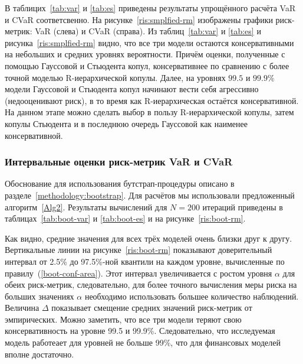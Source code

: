 
В таблицих~\ref{tab:var} и \ref{tab:es} приведены результаты упрощённого расчёта VaR и CVaR соответсвенно.
На рисунке~\ref{ris:smplfied-rm} изображены графики риск-метрик: VaR (слева) и CVaR (справа). 
Из таблиц~\ref{tab:var} и \ref{tab:es} и рисунка~\ref{ris:smplfied-rm} видно, что все три модели остаются консервативными на небольших и средних уровнях вероятности. 
Причём оценки, полученные с помощью Гауссовой и Стьюдента копул, консервативнее по сравнению с более точной моделью R-иерархической копулы.
Далее, на уровнях $99.5$ и $99.9\%$ модели Гауссовой и Стьюдента копул начинают вести себя агрессивно (недооценивают риск), в то время как R-иерархическая остаётся консервативной.
На данном этапе можно сделать выбор в пользу R-иерархической копулы, затем копулы Стьюдента и в последнюю очередь Гауссовой как наименее консервативной.

\subsubsection{Интервальные оценки риск-метрик VaR и CVaR}

Обоснование для использования бутстрап-процедуры описано в разделе~\ref{methodology:bootstrap}.
Для расчётов мы использовали предложенный алгоритм~\ref{Alg2}.
Результаты вычислений для $N=200$ итераций приведены в таблицах~\ref{tab:boot-var} и \ref{tab:boot-es} и на рисунке~\ref{ris:boot-rm}.

Как видно, средние значения для всех трёх моделей очень близки друг к другу.
Вертикальные линии на рисунке~\ref{ris:boot-rm} показывают доверительный интервал от 2.5\% до 97.5\%-ной квантили на каждом уровне, вычисленные по правилу~(\ref{boot-conf-area}).
Этот интервал увеличивается с ростом уровня $\alpha$ для обеих риск-метрик, следовательно, для более точного вычисления меры риска на больших значениях $\alpha$ необходимо использовать большее количество наблюдений.
Величина $\Delta$ показывает смещение средних значений риск-метрик от эмпирических. 
Можно заметить, что все три модели теряют свою консервативность на уровне 99.5 и 99.9\%.
Следовательно, что исследуемая модель работеает для уровней не больше 99\%, что для финансовых моделей вполне достаточно.

